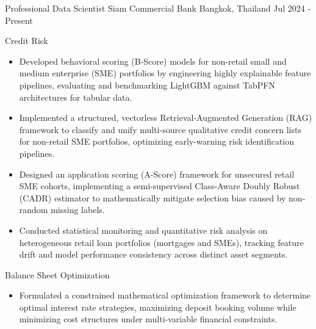 

\begin{cventries}


  \cventry
    {Professional Data Scientist} %
    {Siam Commercial Bank} %
    {Bangkok, Thailand} %
    {Jul 2024 - Present} %
    {
      \begin{cvitems} %
        \item{Credit Risk}
        \begin{itemize}
          \item[\(\cdot \)] {Developed behavioral scoring (B-Score) models for non-retail small and medium enterprise (SME) portfolios by engineering highly explainable feature pipelines, evaluating and benchmarking LightGBM against TabPFN architectures for tabular data.}
          \item[\(\cdot \)] {Implemented a structured, vectorless Retrieval-Augmented Generation (RAG) framework to classify and unify multi-source qualitative credit concern lists for non-retail SME portfolios, optimizing early-warning risk identification pipelines.}
          \item[\(\cdot \)] {Designed an application scoring (A-Score) framework for unsecured retail SME cohorts, implementing a semi-supervised Class-Aware Doubly Robust (CADR) estimator to mathematically mitigate selection bias caused by non-random missing labels.}
          \item[\(\cdot \)] {Conducted statistical monitoring and quantitative risk analysis on heterogeneous retail loan portfolios (mortgages and SMEs), tracking feature drift and model performance consistency across distinct asset segments.}
        \end{itemize}
        \item{Balance Sheet Optimization}
        \begin{itemize}
          \item[\(\cdot \)] {Formulated a constrained mathematical optimization framework to determine optimal interest rate strategies, maximizing deposit booking volume while minimizing cost structures under multi-variable financial constraints.}

\end{itemize}
\end{cvitems}}
\end{cventries}
